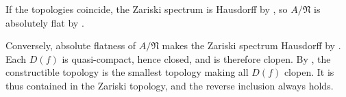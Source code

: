If the topologies coincide, the Zariski spectrum is Hausdorff by , so $A/\mathfrak N$ is absolutely flat by .

Conversely, absolute flatness of $A/\mathfrak N$ makes the Zariski spectrum Hausdorff by . Each $D(f)$ is quasi-compact, hence closed, and is therefore clopen. By , the constructible topology is the smallest topology making all $D(f)$ clopen. It is thus contained in the Zariski topology, and the reverse inclusion always holds.
